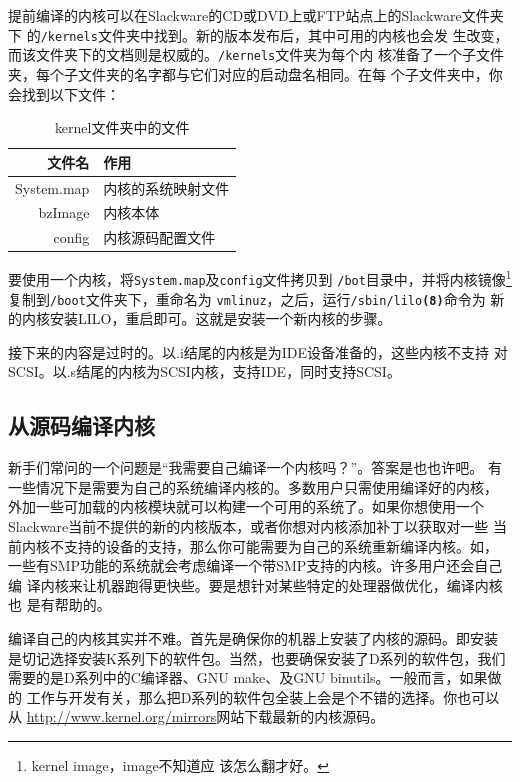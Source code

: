 提前编译的内核可以在Slackware的CD或DVD上或FTP站点上的Slackware文件夹下
的\texttt{/kernels}文件夹中找到。新的版本发布后，其中可用的内核也会发
生改变，而该文件夹下的文档则是权威的。\texttt{/kernels}文件夹为每个内
核准备了一个子文件夹，每个子文件夹的名字都与它们对应的启动盘名相同。在每
个子文件夹中，你会找到以下文件：
\begin{table}[htpb]
  \centering
  \begin{tabular}{r|l}
    \hline\hline 
    文件名 & 作用 \\ \hline
    System.map & 内核的系统映射文件 \\
    bzImage & 内核本体 \\
    config & 内核源码配置文件  \\
    \hline\hline
  \end{tabular}
  \caption{kernel文件夹中的文件}
  \label{tab:kernelFiles}
\end{table}

要使用一个内核，将\texttt{System.map}及\texttt{config}文件拷贝到
\texttt{/bot}目录中，并将内核镜像\footnote{kernel image，image不知道应
  该怎么翻才好。}复制到\texttt{/boot}文件夹下，重命名为
\texttt{vmlinuz}，之后，运行\texttt{/sbin/lilo\textbf{(8)}}命令为
新的内核安装LILO，重启即可。这就是安装一个新内核的步骤。

接下来的内容是过时的。以.i结尾的内核是为IDE设备准备的，这些内核不支持
对SCSI。以.s结尾的内核为SCSI内核，支持IDE，同时支持SCSI。

\subsection{从源码编译内核}
\label{sec:systemConfig:selectingAKernel:compilingAKernel}

新手们常问的一个问题是``我需要自己编译一个内核吗？''。答案是也也许吧。
有一些情况下是需要为自己的系统编译内核的。多数用户只需使用编译好的内核，
外加一些可加载的内核模块就可以构建一个可用的系统了。如果你想使用一个
Slackware当前不提供的新的内核版本，或者你想对内核添加补丁以获取对一些
当前内核不支持的设备的支持，那么你可能需要为自己的系统重新编译内核。如，
一些有SMP功能的系统就会考虑编译一个带SMP支持的内核。许多用户还会自己编
译内核来让机器跑得更快些。要是想针对某些特定的处理器做优化，编译内核也
是有帮助的。

编译自己的内核其实并不难。首先是确保你的机器上安装了内核的源码。即安装
是切记选择安装K系列下的软件包。当然，也要确保安装了D系列的软件包，我们
需要的是D系列中的C编译器、GNU make、及GNU binutils。一般而言，如果做的
工作与开发有关，那么把D系列的软件包全装上会是个不错的选择。你也可以从
\url{http://www.kernel.org/mirrors}网站下载最新的内核源码。


